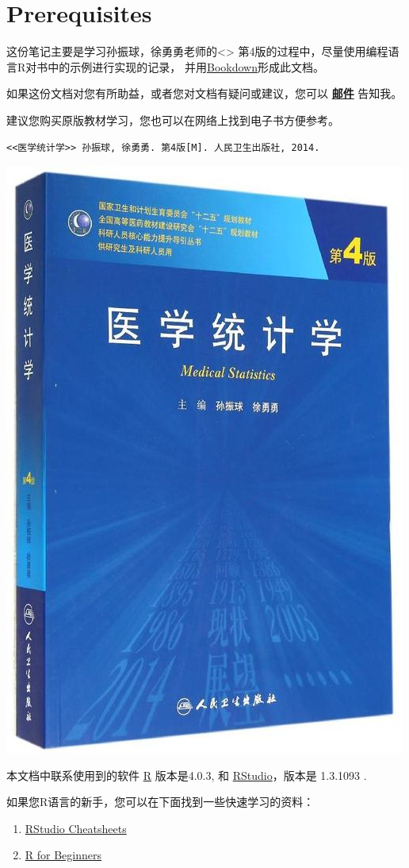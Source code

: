 \documentclass[
]{article}
\author{}
\date{\vspace{-2.5em}}
\providecommand{\tightlist}{%
  \setlength{\itemsep}{0pt}\setlength{\parskip}{0pt}}
\begin{document}
{
\setcounter{tocdepth}{2}
\tableofcontents
}
\hypertarget{prerequisites}{%
\section{Prerequisites}\label{prerequisites}}

这份笔记主要是学习孙振球，徐勇勇老师的\textless{}\textgreater{} 第4版的过程中，尽量使用编程语言R对书中的示例进行实现的记录，
并用\href{https://github.com/rstudio/bookdown}{Bookdown}形成此文档。

如果这份文档对您有所助益，或者您对文档有疑问或建议，您可以 \textbf{\href{mailto:wxh244295043@gamil.com}{邮件}} 告知我。

建议您购买原版教材学习，您也可以在网络上找到电子书方便参考。

\begin{verbatim}
<<医学统计学>> 孙振球, 徐勇勇. 第4版[M]. 人民卫生出版社, 2014.
\end{verbatim}

\begin{center}\includegraphics[width=0.25\linewidth]{image/Ms_logo} \end{center}

本文档中联系使用到的软件 \href{https://www.r-project.org/}{R} 版本是4.0.3, 和 \href{https://rstudio.com/}{RStudio}，版本是 1.3.1093 .

如果您R语言的新手，您可以在下面找到一些快速学习的资料：

\begin{enumerate}
\def\labelenumi{\arabic{enumi}.}
\tightlist
\item
  \href{https://rstudio.com/resources/cheatsheets/}{RStudio Cheatsheets}
\item
  \href{https://cran.r-project.org/doc/contrib/Paradis-rdebuts_en.pdf}{R for Beginners}
\end{enumerate}
\end{document}
